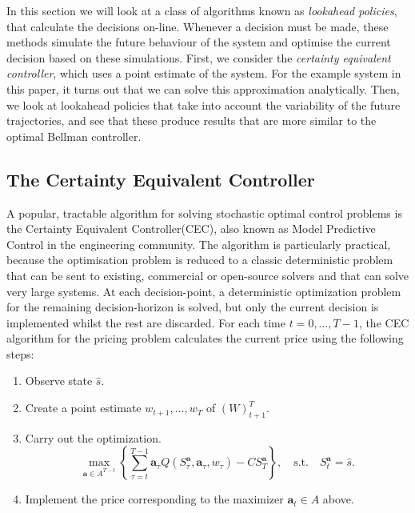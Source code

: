 \documentclass[main.tex]{subfiles}
\begin{document}
In this section we will look at a class of algorithms known as
\emph{lookahead policies}, that calculate the decisions on-line.
Whenever a decision must be made, these methods simulate the future
behaviour of the system and optimise the current decision based on
these simulations. First, we consider the \emph{certainty equivalent
  controller}, which uses a point estimate of the system. For the
example system in this paper, it turns out that we can solve
this approximation analytically.
Then, we look at lookahead policies that take into account the
variability of the future trajectories, and see that these produce
results that are more similar to the optimal Bellman controller.

\subsection{The Certainty Equivalent Controller}
A popular, tractable algorithm for solving stochastic optimal control
problems is the Certainty Equivalent Controller(CEC), also known as Model
Predictive Control in the engineering community.
The algorithm is particularly practical, because the optimisation
problem is reduced to a classic deterministic problem that can
be sent to existing, commercial or open-source solvers and that can
solve very large systems.
At each decision-point, a deterministic optimization problem for the
remaining decision-horizon is solved, but only the current decision is
implemented whilst the rest are discarded.
For each time $t=0,\dots,T-1$, the CEC algorithm for the pricing
problem calculates the current price using the following steps:
\begin{enumerate}
\item Observe state $\hat s$.
\item Create a point estimate $w_{t+1},\dots,w_T$ of ${(W)}_{t+1}^T$.
\item Carry out the optimization.
  \begin{equation}
    \max_{\mathbf a\in A^{T-t}}\left\{\sum_{\tau=t}^{T-1}\mathbf
      a_\tau Q(S_\tau^{\mathbf a},\mathbf
      a_\tau,w_{\tau})-CS_T^{\mathbf a}\right\},
    \quad \text{s.t.}\quad S_t^{\mathbf a}=\hat s.
  \end{equation}
\item Implement the price corresponding to the maximizer $\mathbf
  a_t\in A$ above.
\end{enumerate}

\end{document}
